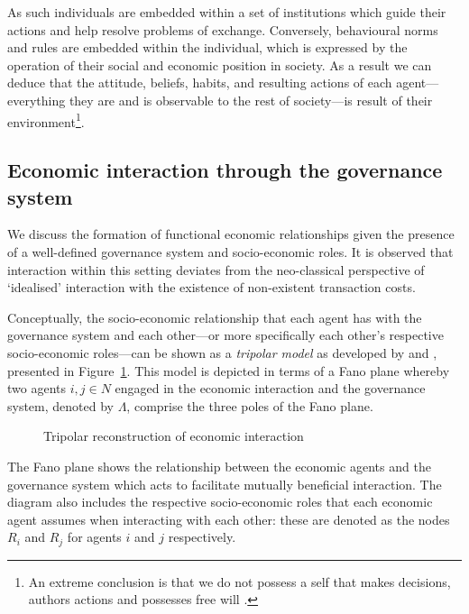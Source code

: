 As such individuals are embedded within a set of institutions which guide their actions and help resolve problems of exchange. Conversely, behavioural norms and rules are embedded within the individual, which is expressed by the operation of their social and economic position in society. As a result we can deduce that the attitude, beliefs, habits, and resulting actions of each agent---everything they are and is observable to the rest of society---is result of their environment\footnote{An extreme conclusion is that we do not possess a self that makes decisions, authors actions and possesses free will \citep{Hood2013}.}.

\subsection{Economic interaction through the governance system} \label{interactionGovernanceSystem}

We discuss the formation of functional economic relationships given the presence of a well-defined governance system and socio-economic roles. It is observed that interaction within this setting deviates from the neo-classical perspective of `idealised' interaction with the existence of non-existent transaction costs.

Conceptually, the socio-economic relationship that each agent has with the governance system and each other---or more specifically each other's respective socio-economic roles---can be shown as a \textit{tripolar model} as developed by \citet{Ruys1981} and \citet{Gilles1990}, presented in Figure~\ref{fig:governance}. This model is depicted in terms of a Fano plane whereby two agents $i,j \in N$ engaged in the economic interaction and the governance system, denoted by $\Lambda$, comprise the three poles of the Fano plane.
\begin{figure}[t]
\label{fig:governance}
\begin{center}
\end{center}
\caption[Tripolar reconstruction of economic interaction]{Tripolar reconstruction of economic interaction}
\end{figure}
The Fano plane shows the relationship between the economic agents and the governance system which acts to facilitate mutually beneficial interaction. The diagram also includes the respective socio-economic roles that each economic agent assumes when interacting with each other: these are denoted as the nodes $R_{i}$ and $R_{j}$ for agents $i$ and $j$ respectively.

